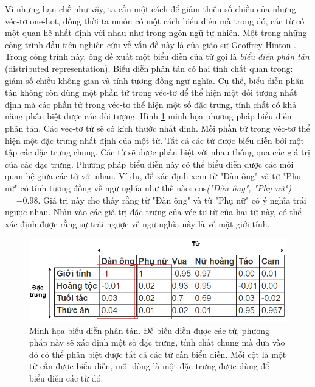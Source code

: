 Vì những hạn chế như vậy, ta cần một cách để giảm thiểu số chiều của những véc-tơ one-hot, đồng thời ta muốn có một cách biểu diễn mà trong đó, các từ có một quan hệ nhất định với nhau như trong ngôn ngữ tự nhiên. Một trong những công trình đầu tiên nghiên cứu về vấn đề này là của giáo sư Geoffrey Hinton \cite{distributedrepHinton}. Trong công trình này, ông đề xuất một biểu diễn của từ gọi là \textit{biểu diễn phân tán} (distributed representation). Biểu diễn phân tán có hai tính chất quan trọng: giảm số chiều không gian và tính tương đồng ngữ nghĩa. Cụ thể, biểu diễn phân tán không còn dùng một phần tử trong véc-tơ để thể hiện một đối tượng nhất định mà các phần tử trong véc-tơ thể hiện một số đặc trưng, tính chất có khả năng phân biệt được các đối tượng. Hình \ref{fig_distributed_representation} minh họa phương pháp biểu diễn phân tán. Các véc-tơ từ sẽ có kích thước nhất định. Mỗi phần tử trong véc-tơ thể hiện một đặc trưng nhất định của một từ. Tất cả các từ được biểu diễn bởi một tập các đặc trưng chung. Các từ sẽ được phân biệt với nhau thông qua các giá trị của các đặc trưng. Phương pháp biểu diễn này có thể biểu diễn được các mối quan hệ giữa các từ với nhau. Ví dụ, để xác định xem từ "Đàn ông" và từ "Phụ nữ" có tính tương đồng về ngữ nghĩa như thế nào: cos\textit{("Đàn ông", "Phụ nữ")}$ = -0.98$. Giá trị này cho thấy rằng từ "Đàn ông" và từ "Phụ nữ" có ý nghĩa trái ngược nhau. Nhìn vào các giá trị đặc trưng của véc-tơ từ của hai từ này, có thể xác định được rằng sự trái ngược về ngữ nghĩa này là về mặt giới tính.

\begin{figure}
	\centering
	\includegraphics[width=1.0\textwidth]{distributed-representation_1}
	\caption[Minh họa biểu diễn phân tán]{Minh họa biểu diễn phân tán. Để biểu diễn được các từ, phương pháp này sẽ xác định một số đặc trưng, tính chất chung mà dựa vào đó có thể phân biệt được tất cả các từ cần biểu diễn. Mỗi cột là một từ cần được biểu diễn, mỗi dòng là một đặc trưng được dùng để biểu diễn các từ đó.}
	\label{fig_distributed_representation}
\end{figure}

